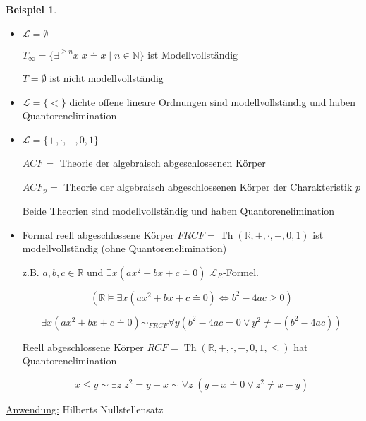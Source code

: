\documentclass[12pt,parskip=full]{scrartcl}
\newcommand{\setN}{\mathbb{N}}
\newcommand{\setR}{\mathbb{R}}
\newcommand{\heading}{\underline}
\theoremstyle{definition}
\newtheorem{example}[theorem]{Beispiel}
\begin{document}
	\begin{example}
		\begin{itemize}
			\item $\mathcal{L} = \emptyset$
			
			$T_\infty = \{ \exists^{\geq n} x \; x \doteq x \mid n \in \setN \}$ ist Modellvollständig
			
			$T = \emptyset$ ist nicht modellvollständig
			
			\item $\mathcal{L} = \{ < \}$ dichte offene lineare Ordnungen sind modellvollständig und haben Quantorenelimination
			
			\item $\mathcal{L} = \{ +, \cdot, - , 0, 1 \}$
			
			$ACF = $ Theorie der algebraisch abgeschlossenen Körper
			
			$ACF_p = $ Theorie der algebraisch abgeschlossenen Körper der Charakteristik $p$
			
			Beide Theorien sind modellvollständig und haben Quantorenelimination
			
			\item Formal reell abgeschlossene Körper $FRCF = \operatorname{Th}(\setR, +, \cdot, -, 0, 1)$ ist modellvollständig (ohne Quantorenelimination)
			
			z.B. $a,b,c \in \setR$ und $\exists x (ax^2 + bx + c \doteq 0)$ $\mathcal{L}_R$-Formel.
			
			\begin{equation*}
				\left( \setR \models \exists x (ax^2 + bx + c \doteq 0) \Leftrightarrow b^2 - 4ac \geq 0 \right)
			\end{equation*}
			
			\begin{equation*}
				\exists x (ax^2 + bx + c \doteq 0) \sim_{FRCF} \forall y (b^2 - 4ac = 0 \lor y^2 \neq -(b^2 - 4ac))
			\end{equation*}
			
			Reell abgeschlossene Körper $RCF = \operatorname{Th}(\setR, +, \cdot, -, 0, 1, \leq)$ hat Quantorenelimination
			
			\begin{equation*}
				x \leq y \sim \exists z \; z^2 = y - x \sim \forall z \; (y - x \doteq 0 \lor z^2 \neq x - y)
			\end{equation*}
		\end{itemize}
	\end{example}

	\heading{Anwendung:} Hilberts Nullstellensatz
	
\end{document}
